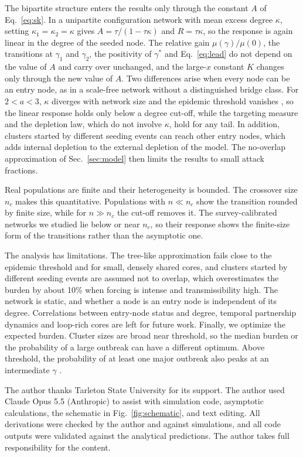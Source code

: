 \documentclass[pre,twocolumn,superscriptaddress,amsmath,amssymb,floatfix]{revtex4-2}
\begin{document}
The bipartite structure enters the results only through the constant $A$ of
Eq.~\eqref{eq:sk}. In a unipartite configuration network with mean excess
degree $\kappa$, setting $\kappa_1=\kappa_2=\kappa$ gives $A=\tau/(1-\tau\kappa)$ and $R=\tau\kappa$, so the
response is again linear in the degree of the seeded node. The relative gain
$\mu(\gamma)/\mu(0)$, the transitions at $\gamma_1$ and $\gamma_2$, the positivity of $\gamma^*$ and
Eq.~\eqref{eq:lead} do not depend on the value of $A$ and carry over unchanged,
and the large-$x$ constant $K$ changes only through the new value of $A$. Two
differences arise when every node can be an entry node, as in a scale-free
network without a distinguished bridge class. For $2<a<3$, $\kappa$ diverges with
network size and the epidemic threshold vanishes
\cite{pastorsatorras2015epidemic}, so the linear response holds only below a
degree cut-off, while the targeting measure and the depletion law, which do
not involve $\kappa$, hold for any tail. In addition, clusters started by
different seeding events can reach other entry nodes, which adds internal
depletion to the external depletion of the model. The no-overlap approximation
of Sec.~\ref{sec:model} then limits the results to small attack fractions.

Real populations are finite and their heterogeneity is bounded. The crossover
size $n_c$ makes this quantitative. Populations with $n\ll n_c$ show the
transition rounded by finite size, while for $n\gg n_c$ the cut-off removes it.
The survey-calibrated networks we studied lie below or near $n_c$, so their
response shows the finite-size form of the transitions rather than the
asymptotic one.

The analysis has limitations. The tree-like approximation fails close to the
epidemic threshold and for small, densely shared cores, and clusters started
by different seeding events are assumed not to overlap, which overestimates
the burden by about 10\% when forcing is intense and transmissibility high.
The network is static, and whether a node is an entry node is independent of
its degree. Correlations between entry-node status and degree, temporal
partnership dynamics and loop-rich cores are left for future work. Finally, we
optimize the expected burden. Cluster sizes are broad near threshold, so the
median burden or the probability of a large outbreak can have a different
optimum. Above threshold, the probability of at least one major outbreak also
peaks at an intermediate $\gamma$ \cite{SM}.

\begin{acknowledgments}
The author thanks Tarleton State University for its support. The author used
Claude Opus 5.5 (Anthropic) to assist with simulation code, asymptotic
calculations, the schematic in Fig.~\ref{fig:schematic}, and text editing. All
derivations were checked by the author and against simulations, and all code
outputs were validated against the analytical predictions. The author takes
full responsibility for the content.
\end{acknowledgments}
\end{document}
